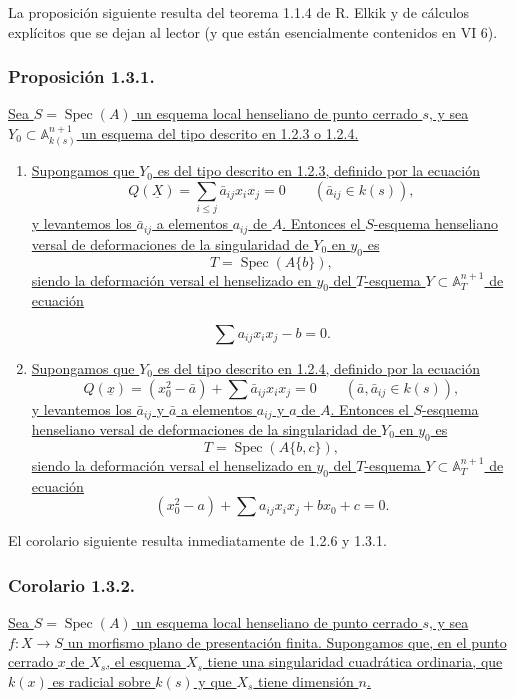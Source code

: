 La proposición siguiente resulta del teorema 1.1.4 de R. Elkik y de
cálculos explícitos que se dejan al lector (y que están esencialmente
contenidos en VI 6).

\subsubsection*{Proposición 1.3.1.}
\underline{Sea $S=\operatorname{Spec}(A)$ un esquema local henseliano
de punto cerrado $s$, y sea
$Y_0\subset\mathbb A_{k(s)}^{n+1}$ un esquema del tipo descrito en
1.2.3 o 1.2.4.}

\begin{enumerate}[label=(\roman*),leftmargin=2.6em]
\item \underline{Supongamos que $Y_0$ es del tipo descrito en 1.2.3,
definido por la ecuación}
\[
Q(\underline X)=\sum_{i\leq j}\bar a_{ij}x_i x_j=0
\qquad(\bar a_{ij}\in k(s)),
\]
\underline{y levantemos los $\bar a_{ij}$ a elementos $a_{ij}$ de
$A$. Entonces el $S$-esquema henseliano versal de deformaciones de la
singularidad de $Y_0$ en $y_0$ es}
\[
T=\operatorname{Spec}(A\{b\}),
\]
\underline{siendo la deformación versal el henselizado en $y_0$ del
$T$-esquema $Y\subset\mathbb A_T^{n+1}$ de ecuación}

\pageoriginale

\[
\sum a_{ij}x_i x_j-b=0.
\]

\item \underline{Supongamos que $Y_0$ es del tipo descrito en 1.2.4,
definido por la ecuación}
\[
Q(\underline x)=(x_0^2-\bar a)+\sum\bar a_{ij}x_i x_j=0
\qquad(\bar a,\bar a_{ij}\in k(s)),
\]
\underline{y levantemos los $\bar a_{ij}$ y $\bar a$ a elementos
$a_{ij}$ y $a$ de $A$. Entonces el $S$-esquema henseliano versal de
deformaciones de la singularidad de $Y_0$ en $y_0$ es}
\[
T=\operatorname{Spec}(A\{b,c\}),
\]
\underline{siendo la deformación versal el henselizado en $y_0$ del
$T$-esquema $Y\subset\mathbb A_T^{n+1}$ de ecuación}
\[
(x_0^2-a)+\sum a_{ij}x_i x_j+b x_0+c=0.
\]
\end{enumerate}

El corolario siguiente resulta inmediatamente de 1.2.6 y 1.3.1.

\subsubsection*{Corolario 1.3.2.}
\underline{Sea $S=\operatorname{Spec}(A)$ un esquema local henseliano
de punto cerrado $s$, y sea $f:X\to S$ un morfismo plano de
presentación finita. Supongamos que, en el punto cerrado $x$ de $X_s$,
el esquema $X_s$ tiene una singularidad cuadrática ordinaria, que
$k(x)$ es radicial sobre $k(s)$ y que $X_s$ tiene dimensión $n$.}

